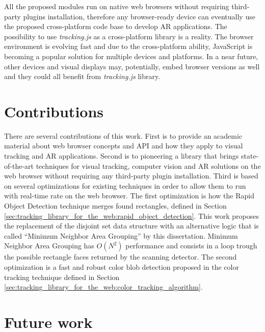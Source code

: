 All the proposed modules run on native web browsers without requiring third-party plugins installation, therefore any browser-ready device can eventually use the proposed cross-platform code base to develop AR applications. The possibility to use \textit{tracking.js} as a cross-platform library is a reality. The browser environment is evolving fast and due to the cross-platform ability, JavaScript is becoming a popular solution for multiple devices and platforms. In a near future, other devices and visual displays may, potentially, embed browser versions as well and they could all benefit from \textit{tracking.js} library.

\section{Contributions} %
\label{sec:conclusion:contributions}

There are several contributions of this work. First is to provide an academic material about web browser concepts and API and how they apply to visual tracking and AR applications. Second is to pioneering a library that brings state-of-the-art techniques for visual tracking, computer vision and AR solutions on the web browser without requiring any third-party plugin installation. Third is based on several optimizations for existing techniques in order to allow them to run with real-time rate on the web browser. The first optimization is how the Rapid Object Detection technique   merges found rectangles, defined in Section \ref{sec:tracking_library_for_the_web:rapid_object_detection}. This work proposes the replacement of the disjoint set data structure with an alternative logic that is called ``Minimum Neighbor Area Grouping'' by this dissertation. Minimum Neighbor Area Grouping has $O(N^2)$ performance \cite{black2007big} and consists in a loop trough the possible rectangle faces returned by the scanning detector. The second optimization is a fast and robust color blob detection proposed in the color tracking technique defined in Section \ref{sec:tracking_library_for_the_web:color_tracking_algorithm}.


\section{Future work} %
\label{sec:conclusion:future_work}

